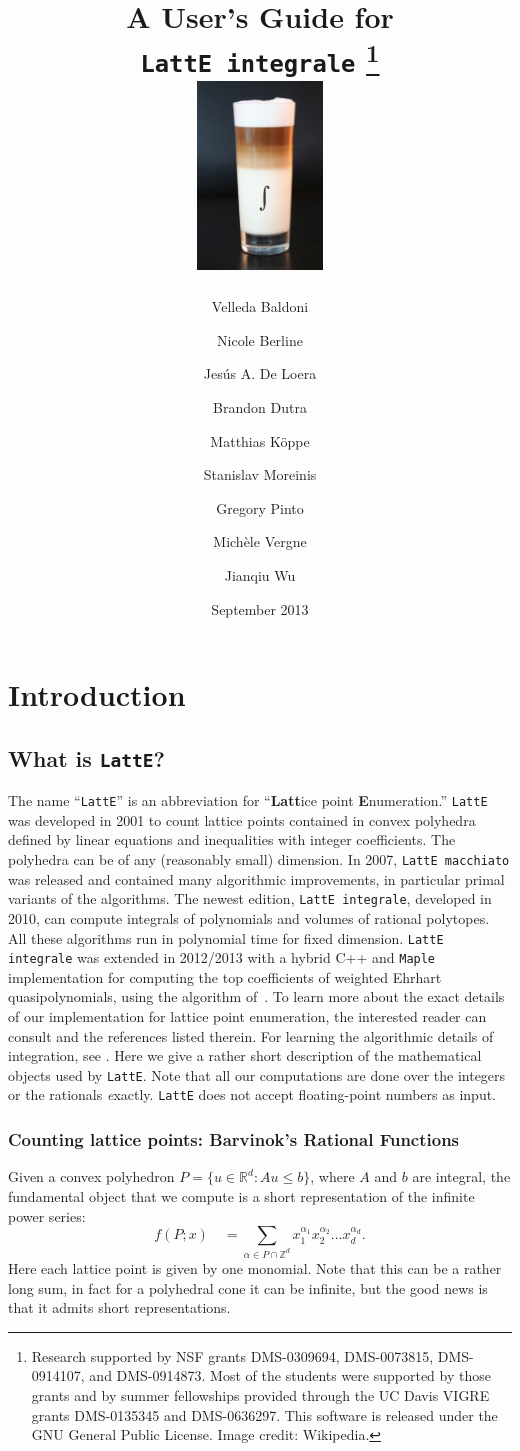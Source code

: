 \documentclass{article}
\title{A User's Guide for\\ {\tt LattE integrale} \latteV 
\footnote{Research supported by NSF grants DMS-0309694, 
DMS-0073815, DMS-0914107, and DMS-0914873.
Most of the students were supported by those
grants and by summer fellowships provided through the UC Davis VIGRE grants
DMS-0135345 and DMS-0636297. This
software is released under the GNU General Public License.  Image credit: Wikipedia.}
\\[4ex] \includegraphics[width=0.25\textwidth]{latte-integrale.jpg}
}%
\author{
Velleda Baldoni \and
Nicole Berline \and 
Jes\'us A. De Loera \and
Brandon Dutra \and
Matthias K\"oppe \and 
Stanislav Moreinis \and
Gregory Pinto \and
Mich\`ele Vergne \and
Jianqiu Wu \and
}
\date{September 2013}
\newcommand{\Z}{{\mathbb Z}}
\newcommand{\R}{{\mathbb R}}
\newcommand{\latte}{{\tt LattE}\xspace}
\newcommand{\latteInt}{{\tt LattE integrale}\xspace}
\newcommand{\maple}{{\tt Maple}\xspace}
\begin{document}
\maketitle{}

\newpage

\tableofcontents

\newpage

\section{Introduction}

\subsection{What is {\tt LattE}?} \label{intro}

The name ``{\tt LattE}'' is an abbreviation for ``{\bf Latt}ice point 
{\bf E}numeration.'' \latte was developed in 2001 to count lattice points contained in 
convex polyhedra defined by linear equations and inequalities with 
integer coefficients. The polyhedra can be of any (reasonably small) 
dimension. In 2007, {\tt LattE macchiato} was released and contained many 
algorithmic improvements, in particular primal variants of the algorithms. The newest edition, \latteInt, developed
in 2010, can compute integrals of polynomials and volumes of rational polytopes. 
All these algorithms run in polynomial
time for fixed dimension. 
\latteInt was extended in 2012/2013 with a hybrid C++ and \maple
implementation for computing the top coefficients of weighted Ehrhart
quasipolynomials, using the algorithm of~\cite{so-called-paper-1}. 
To
learn more about the exact details of our implementation for lattice point enumeration, the interested reader can consult 
\cite{koeppe:irrational-barvinok, latte1} and the references listed therein. 
For learning the algorithmic details of integration, see \cite{howToIntegratePolynomialSimplex, latte-integrale-paper}. Here we
give a rather short description of the mathematical objects used by
{\tt LattE}. Note that all our computations are done over the integers or the rationals {\emph exactly}.
\latte does not accept floating-point numbers as input. 

\subsubsection{Counting lattice points: Barvinok's Rational Functions}

Given a convex polyhedron $P = \{u\in\R^d:Au\leq b\}$, where $A$ and
$b$ are integral, the fundamental object that we compute is a short 
representation of the infinite power series:
\[
f(P;x) \quad = \sum_{\alpha\in P\cap\Z^d} x_1^{\alpha_1}
x_2^{\alpha_2} \ldots x_d^{\alpha_d}.
\]
Here each lattice point is given by one monomial. Note that this can be 
a rather long sum, in fact for a polyhedral cone it can be infinite, but 
the good news is that it admits short representations.
\end{document}
